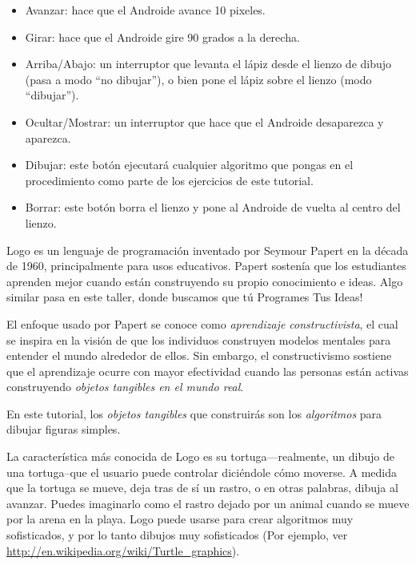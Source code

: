 \begin{itemize}
\item Avanzar: hace que el Androide avance 10 pixeles.

\item Girar: hace que el Androide gire 90 grados a la derecha.

\item Arriba/Abajo: un interruptor que levanta el lápiz desde el
  lienzo de dibujo (pasa a modo ``no dibujar''), o bien pone el lápiz
  sobre el lienzo (modo ``dibujar'').

\item Ocultar/Mostrar: un interruptor que hace que el Androide
  desaparezca y aparezca.

\item Dibujar: este botón ejecutará cualquier algoritmo que pongas en
  el procedimiento  como parte de los ejercicios de
  este tutorial.

\item Borrar: este botón borra el lienzo y pone al Androide de vuelta
  al centro del lienzo.

\end{itemize}

Logo es un lenguaje de programación inventado por Seymour Papert en la
década de 1960, principalmente para usos educativos. Papert sostenía
que los estudiantes aprenden mejor cuando están construyendo su propio
conocimiento e ideas. Algo similar pasa en este taller, donde buscamos
que tú Programes Tus Ideas!

El enfoque usado por Papert se conoce como \emph{aprendizaje
  constructivista}, el cual se inspira en la visión de que los
individuos  construyen modelos mentales para entender el
mundo alrededor de ellos. Sin embargo, el constructivismo sostiene que
el aprendizaje ocurre con mayor efectividad cuando las personas están
activas construyendo \emph{objetos tangibles en el mundo real}.

En este tutorial, los \emph{objetos tangibles} que construirás son los
\emph{algoritmos} para dibujar figuras simples.

La característica más conocida de Logo es su tortuga---realmente, un
dibujo de una tortuga--que el usuario puede controlar diciéndole cómo
moverse. A medida que la tortuga se mueve, deja tras de sí un rastro,
o en otras palabras, dibuja al avanzar. Puedes imaginarlo como el
rastro dejado por un animal cuando se mueve por la arena en la
playa. Logo puede usarse para crear algoritmos muy sofisticados, y por
lo tanto dibujos muy sofisticados (Por ejemplo, ver
\url{http://en.wikipedia.org/wiki/Turtle_graphics}).

